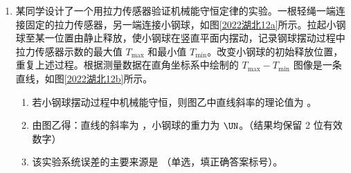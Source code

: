\documentclass[\gkver]{gaokaozhenti}
\begin{document}
\begin{enumerate}
{	则有 $\sin(\theta_{1}+\alpha)=\frac{\mu mg+ma_{1}}{F\sqrt{1+\mu^{2}}}\leqslant 1$

	同理磁场方向与水平方向夹角为 $\theta_{2}$，$\theta_{2}<90^{\circ}$，当导体棒减速，且加速度最大时，合力向左最大，根据左手定则和受力分析可知安培力应该斜向左下方，磁场方向斜向左上方，此时有 $F\sin\theta_{2}+\mu(mg+F\cos\theta_{2})=ma_{2}$

	有 $F\sqrt{1+\mu^{2}}\sin(\theta_{2}+\alpha)=ma_{2}-\mu mg$

	所以有 $\sin(\theta_{2}+\alpha)=\frac{ma_{2}-\mu mg}{F\sqrt{1+\mu^{2}}}\leqslant 1$

	当加速或减速加速度分别最大时，不等式均取等于，联立可得 $\mu=\frac{\sqrt{3}}{3}$

	代入 $\cos\alpha=\frac{1}{\sqrt{1+\mu^{2}}}$

	可得 $\alpha=30^{\circ}$，此时 $\theta_{1}=\theta_{2}=60^{\circ}$

	加速阶段加速度大小最大时，磁场方向斜向右下方，有 $\theta=\theta_{1}=60^{\circ}$

	减速阶段加速度大小最大时，磁场方向斜向左上方，有 $\theta=\pi-\theta_{2}=120^{\circ}$

	故 BC 正确，AD 错误。

	故选 BC。
}

\item
某同学设计了一个用拉力传感器验证机械能守恒定律的实验。一根轻绳一端连接固定的拉力传感器，另一端连接小钢球，如图\ref{2022湖北12a}所示。拉起小钢球至某一位置由静止释放，使小钢球在竖直平面内摆动，记录钢球摆动过程中拉力传感器示数的最大值 $T_\text{max}$ 和最小值 $T_\text{min}$。改变小钢球的初始释放位置，重复上述过程。根据测量数据在直角坐标系中绘制的 $T_\text{max}-T_\text{min}$ 图像是一条直线，如图\ref{2022湖北12b}所示。


\begin{enumerate}
	\item
	若小钢球摆动过程中机械能守恒，则图乙中直线斜率的理论值为 。
	\item
	由图乙得：直线的斜率为 ，小钢球的重力为  $\UN$。（结果均保留 2 位有效数字）
	\item
	该实验系统误差的主要来源是 （单选，填正确答案标号）。


\end{enumerate}
\end{enumerate}
\end{document}
